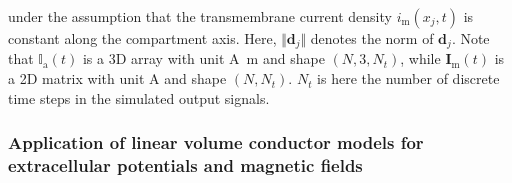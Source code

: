 under the assumption that the transmembrane current density $i_\mathrm{m}(x_j, t)$ is constant along the compartment axis.
Here, $\Vert\mathbf{d}_j \Vert$ denotes the norm of $\mathbf{d}_j$.
Note that $\mathbb{I}_\mathrm{a}(t)$ is a 3D array with unit \si{\ampere \metre} and shape $(N, 3, N_t)$,
while $\mathbf{I}_\mathrm{m}(t)$ is a 2D matrix with unit \si{A} and shape $(N, N_t)$.
$N_t$ is here the number of discrete time steps in the simulated output signals.



\subsubsection{Application of linear volume conductor models for extracellular potentials and magnetic fields}

